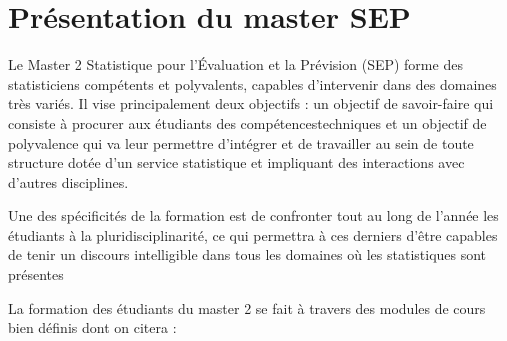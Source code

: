 \documentclass[
  letterpaper,
  DIV=11,
  numbers=noendperiod]{scrreprt}
\begin{document}

\hypertarget{pruxe9sentation-du-master-sep}{%
\chapter{Présentation du master
SEP}\label{pruxe9sentation-du-master-sep}}

Le Master 2 Statistique pour l'Évaluation et la Prévision (SEP) forme
des statisticiens compétents et polyvalents, capables d'intervenir dans
des domaines très variés. Il vise principalement deux objectifs : un
objectif de savoir-faire qui consiste à procurer aux étudiants des
compétencestechniques et un objectif de polyvalence qui va leur
permettre d'intégrer et de travailler au sein de toute structure dotée
d'un service statistique et impliquant des interactions avec d'autres
disciplines.

Une des spécificités de la formation est de confronter tout au long de
l'année les étudiants à la pluridisciplinarité, ce qui permettra à ces
derniers d'être capables de tenir un discours intelligible dans tous les
domaines où les statistiques sont présentes

La formation des étudiants du master 2 se fait à travers des modules de
cours bien définis dont on citera :
\end{document}
